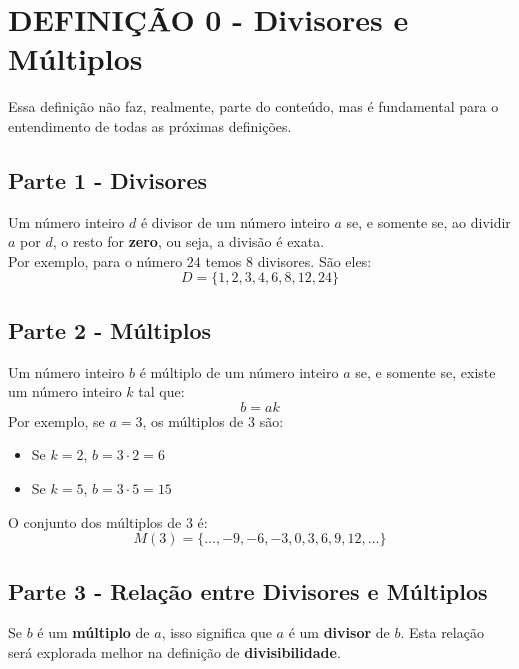 \section*{DEFINIÇÃO 0 - Divisores e Múltiplos}
Essa definição não faz, realmente, parte do conteúdo, mas é fundamental para o entendimento de todas as próximas definições.
\subsection*{Parte 1 - Divisores}
Um número inteiro $d$ é divisor de um número inteiro $a$ se, e somente se, ao dividir $a$ por $d$, o resto for \textbf{zero}, ou seja, a divisão é exata.\\
Por exemplo, para o número $24$ temos $8$ divisores. São eles:\\
\[
    D = \{1,2,3,4,6,8,12,24\}
\]
\subsection*{Parte 2 - Múltiplos}
Um número inteiro $b$ é múltiplo de um número inteiro $a$ se, e somente se, existe um número inteiro $k$ tal que:
\[
    b = ak
\]
Por exemplo, se $a = 3$, os múltiplos de 3 são:
\begin{itemize}
    \item Se $k = 2$, $b = 3 \cdot 2 = 6$
    \item Se $k = 5$, $b = 3 \cdot 5 = 15$
\end{itemize}
O conjunto dos múltiplos de $3$ é:
\[
    M(3) = \{\dots, -9, -6, -3, 0, 3, 6, 9, 12, \dots\}
\]
\subsection*{Parte 3 - Relação entre Divisores e Múltiplos}
Se $b$ é um \textbf{múltiplo} de $a$, isso significa que $a$ é um \textbf{divisor} de $b$. Esta relação será explorada melhor na definição de \textbf{divisibilidade}.
